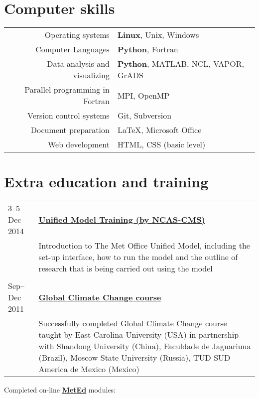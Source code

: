 \documentclass[a4paper,11pt]{article}
\newlength{\mycol}
\begin{document}
\section{Computer skills}
\begin{tabular}{rp{10cm}}
	Operating systems & \textbf{Linux}, Unix, Windows \\
	Computer Languages & \textbf{Python}, Fortran \\
	Data analysis and visualizing & \textbf{Python}, MATLAB, NCL, VAPOR, GrADS \\
	Parallel programming in Fortran & MPI, OpenMP \\
	Version control systems & Git, Subversion \\
	Document preparation & \LaTeX, Microsoft Office \\
	Web development & HTML, CSS (basic level)
\end{tabular}

\section{Extra education and training}
\begin{tabu} to 
{\small 3--5 Dec} 2014 & \textbf{\href{http://cms.ncas.ac.uk/wiki/UmTraining}{Unified Model Training (by NCAS-CMS)}} \\
& Introduction to The Met Office Unified Model, including the set-up interface, how to run the model and the outline of research that is being carried out using the model\\
\\

{\small Sep--Dec} 2011 & \textbf{\href{http://gcc.aos.ecu.edu/}{Global Climate Change course}} \\
& Successfully completed Global Climate Change course taught by East Carolina University (USA) in partnership with Shandong University (China), Faculdade de Jaguariuna (Brazil), Moscow State University (Russia), TUD SUD America de Mexico (Mexico)
\end{tabu}

\vspace{.1in}
Completed on-line \textbf{\href{https://www.meted.ucar.edu/}{MetEd}} modules:
\end{document}
